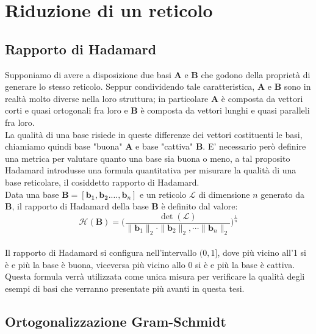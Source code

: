 \section{Riduzione di un reticolo}



\subsection{Rapporto di Hadamard}
Supponiamo di avere a disposizione due basi $\mathbf{A}$ e $\mathbf{B}$ che godono della
proprietà di generare lo stesso reticolo. Seppur condividendo tale caratteristica, 
$\mathbf{A}$ e $\mathbf{B}$ sono in realtà molto diverse nella loro struttura; in particolare
$\mathbf{A}$ è composta da vettori corti e quasi ortogonali fra loro e $\mathbf{B}$ è
composta da vettori lunghi e quasi paralleli fra loro.\\
La qualità di una base risiede in queste differenze dei vettori costituenti le basi, chiamiamo
quindi base "buona" $\mathbf{A}$ e base "cattiva" $\mathbf{B}$.
E' necessario però definire una metrica per valutare quanto una base sia buona o meno, a tal
proposito Hadamard\cite{HDMRD08} introdusse una formula quantitativa per misurare la qualità
di una base reticolare, il cosiddetto rapporto di Hadamard. \\

Data una base $\mathbf{B} = [\mathbf{b_1}, \mathbf{b_2}. \dots, \mathbf{b}_n]$ e un reticolo
$\mathcal{L}$ di dimensione $n$ generato da $\mathbf{B}$, il rapporto di Hadamard della base
$\mathbf{B}$ è definito dal valore:
\[
\mathcal{H}(\mathbf{B}) = 
    \Biggl( 
        \frac{\det(\mathcal{L})}
        {\|\mathbf{b}_1\|_2 \cdot \|\mathbf{b}_2\|_2, \cdots \|\mathbf{b}_n\|_2} 
    \Biggr)^{\frac{1}{n}}
\]
\\
Il rapporto di Hadamard si configura nell'intervallo $(0, 1]$, dove più vicino all'1 si è 
e più la base è buona, viceversa più vicino allo 0 si è e più la base è cattiva. Questa formula
verrà utilizzata come unica misura per verificare la qualità degli esempi di basi che verranno
presentate più avanti in questa tesi.

\subsection{Ortogonalizzazione Gram-Schmidt}
 
